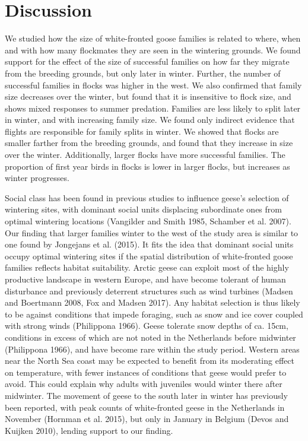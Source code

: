 \documentclass[10pt,twocolumn]{paper}
\begin{document}
\section{Discussion}\label{discussion}

We studied how the size of white-fronted goose families is related to
where, when and with how many flockmates they are seen in the wintering
grounds. We found support for the effect of the size of successful
families on how far they migrate from the breeding grounds, but only
later in winter. Further, the number of successful families in flocks
was higher in the west. We also confirmed that family size decreases
over the winter, but found that it is insensitive to flock size, and
shows mixed responses to summer predation. Families are less likely to
split later in winter, and with increasing family size. We found only
indirect evidence that flights are responsible for family splits in
winter. We showed that flocks are smaller farther from the breeding
grounds, and found that they increase in size over the winter.
Additionally, larger flocks have more successful families. The
proportion of first year birds in flocks is lower in larger flocks, but
increases as winter progresses.

Social class has been found in previous studies to influence geese's
selection of wintering sites, with dominant social units displacing
subordinate ones from optimal wintering locations (Vangilder and Smith
1985, Schamber et al. 2007). Our finding that larger families winter to
the west of the study area is similar to one found by Jongejans et al.
(2015). It fits the idea that dominant social units occupy optimal
wintering sites if the spatial distribution of white-fronted goose
families reflects habitat suitability. Arctic geese can exploit most of
the highly productive landscape in western Europe, and have become
tolerant of human disturbance and previously deterrent structures such
as wind turbines (Madsen and Boertmann 2008, Fox and Madsen 2017). Any
habitat selection is thus likely to be against conditions that impede
foraging, such as snow and ice cover coupled with strong winds
(Philippona 1966). Geese tolerate snow depths of ca. 15cm, conditions in
excess of which are not noted in the Netherlands before midwinter
(Philippona 1966), and have become rare within the study period. Western
areas near the North Sea coast may be expected to benefit from its
moderating effect on temperature, with fewer instances of conditions
that geese would prefer to avoid. This could explain why adults with
juveniles would winter there after midwinter. The movement of geese to
the south later in winter has previously been reported, with peak counts
of white-fronted geese in the Netherlands in November (Hornman et al.
2015), but only in January in Belgium (Devos and Kuijken 2010), lending
support to our finding.
\end{document}
